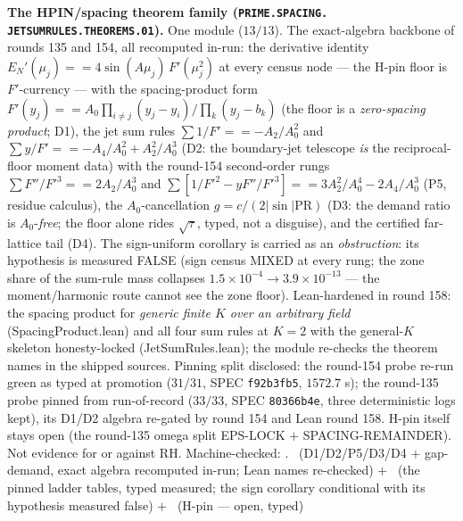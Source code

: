\documentclass[11pt,a4paper]{article}
\theoremstyle{definition}
\begin{document}
\par\smallskip\noindent\textbf{The HPIN/spacing theorem family
(\texttt{PRIME.\allowbreak SPACING.\allowbreak
JETSUMRULES.\allowbreak THEOREMS.01}).}
One module ($13/13$).  The exact-algebra backbone of rounds 135
and 154, all recomputed in-run: the derivative identity
$E_N'(\mu_j) == 4\sin(A\mu_j)\,F'(\mu_j^2)$ at every census node
--- the H-pin floor is $F'$-currency --- with the
spacing-product form $F'(y_j) == A_0 \prod_{i \ne j}(y_j -
y_i)/\prod_k(y_j - b_k)$ (the floor is a \emph{zero-spacing
product}; D1), the jet sum rules $\sum 1/F' == -A_2/A_0^2$ and
$\sum y/F' == -A_4/A_0^2 + A_2^2/A_0^3$ (D2: the boundary-jet
telescope \emph{is} the reciprocal-floor moment data) with the
round-154 second-order rungs $\sum F''/F'^3 == 2A_2/A_0^3$ and
$\sum [1/F'^2 - y F''/F'^3] == 3A_2^2/A_0^4 - 2A_4/A_0^3$ (P5,
residue calculus), the $A_0$-cancellation $g = c/(2|\sin|
\mathrm{PR})$ (D3: the demand ratio is $A_0$-\emph{free}; the
floor alone rides $\sqrt{\tau}$, typed, not a disguise), and the
certified far-lattice tail (D4).  The sign-uniform corollary is
carried as an \emph{obstruction}: its hypothesis is measured
FALSE (sign census MIXED at every rung; the zone share of the
sum-rule mass collapses $1.5\times10^{-4} \to
3.9\times10^{-13}$ --- the moment/harmonic route cannot see the
zone floor).  Lean-hardened in round 158: the spacing product
for \emph{generic finite $K$ over an arbitrary field}
(SpacingProduct.lean) and all four sum rules at $K = 2$ with the
general-$K$ skeleton honesty-locked (JetSumRules.lean); the
module re-checks the theorem names in the shipped sources.
Pinning split disclosed: the round-154 probe re-run green as
typed at promotion ($31/31$, SPEC \texttt{f92b3fb5}, $1572.7$
s); the round-135 probe pinned from run-of-record ($33/33$,
SPEC \texttt{80366b4e}, three deterministic logs kept), its
D1/D2 algebra re-gated by round 154 and Lean round 158.  H-pin
itself stays open (the round-135 omega split EPS-LOCK $+$
SPACING-REMAINDER).  Not evidence for or against RH.
Machine-checked: .
\mE\ (D1/D2/P5/D3/D4 $+$ gap-demand, exact algebra recomputed
in-run; Lean names re-checked) $+$ \mC\ (the pinned ladder
tables, typed measured; the sign corollary conditional with its
hypothesis measured false) $+$ \mO\ (H-pin --- open, typed)
\par\smallskip
\end{document}
